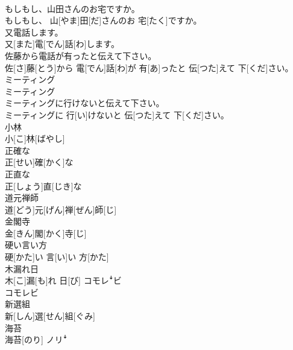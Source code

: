 \documentclass[8pt]{extreport}
\begin{document}
\begin{CJK}{UTF8}{min}
\\	もしもし、山田さんのお宅ですか。	
\\	もしもし、 山[やま]田[だ]さんのお 宅[たく]ですか。
\\	又電話します。	
\\	又[また]電[でん]話[わ]します。
\\	佐藤から電話が有ったと伝えて下さい。	
\\	佐[さ]藤[とう]から 電[でん]話[わ]が 有[あ]ったと 伝[つた]えて 下[くだ]さい。
\\	ミーティング	
\\	ミーティング
\\	ミーティングに行けないと伝えて下さい。	
\\	ミーティングに 行[い]けないと 伝[つた]えて 下[くだ]さい。
\\	小林	
\\	小[こ]林[ばやし]	
\\	正確な	
\\	正[せい]確[かく]な	
\\	正直な	
\\	正[しょう]直[じき]な	
\\	道元禅師	
\\	道[どう]元[げん]禅[ぜん]師[じ]	
\\	金閣寺	
\\	金[きん]閣[かく]寺[じ]	
\\	硬い言い方	
\\	硬[かた]い 言[い]い 方[かた]	
\\	木漏れ日	
\\	木[こ]漏[も]れ 日[び]	コモレꜜビ 
\\	コモレビ
\\	新選組	
\\	新[しん]選[せん]組[ぐみ]	
\\	海苔	
\\	海苔[のり]	ノリꜜ
\end{CJK}
\end{document}
